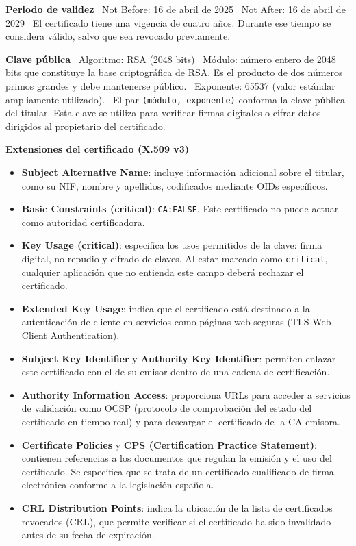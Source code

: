 \textbf{Periodo de validez} \ Not Before: 16 de abril de 2025 \ Not After: 16 de abril de 2029 \ El certificado tiene una vigencia de cuatro años. Durante ese tiempo se considera válido, salvo que sea revocado previamente. 

\textbf{Clave pública} \ Algoritmo: RSA (2048 bits) \ Módulo: número entero de 2048 bits que constituye la base criptográfica de RSA. Es el producto de dos números primos grandes y debe mantenerse público. \ Exponente: 65537 (valor estándar ampliamente utilizado). \ El par \texttt{(módulo, exponente)} conforma la clave pública del titular. Esta clave se utiliza para verificar firmas digitales o cifrar datos dirigidos al propietario del certificado. 

\textbf{Extensiones del certificado (X.509 v3)} 

\begin{itemize} 

    \item \textbf{Subject Alternative Name}: incluye información adicional sobre el titular, como su NIF, nombre y apellidos, codificados mediante OIDs específicos. 

    \item \textbf{Basic Constraints (critical)}: \texttt{CA:FALSE}. Este certificado no puede actuar como autoridad certificadora. 

    \item \textbf{Key Usage (critical)}: especifica los usos permitidos de la clave: firma digital, no repudio y cifrado de claves. Al estar marcado como \texttt{critical}, cualquier aplicación que no entienda este campo deberá rechazar el certificado. 

    \item \textbf{Extended Key Usage}: indica que el certificado está destinado a la autenticación de cliente en servicios como páginas web seguras (TLS Web Client Authentication). 

    \item \textbf{Subject Key Identifier} y \textbf{Authority Key Identifier}: permiten enlazar este certificado con el de su emisor dentro de una cadena de certificación. 

    \item \textbf{Authority Information Access}: proporciona URLs para acceder a servicios de validación como OCSP (protocolo de comprobación del estado del certificado en tiempo real) y para descargar el certificado de la CA emisora. 

    \item \textbf{Certificate Policies} y \textbf{CPS (Certification Practice Statement)}: contienen referencias a los documentos que regulan la emisión y el uso del certificado. Se especifica que se trata de un certificado cualificado de firma electrónica conforme a la legislación española. 

    \item \textbf{CRL Distribution Points}: indica la ubicación de la lista de certificados revocados (CRL), que permite verificar si el certificado ha sido invalidado antes de su fecha de expiración. 

\end{itemize} 

